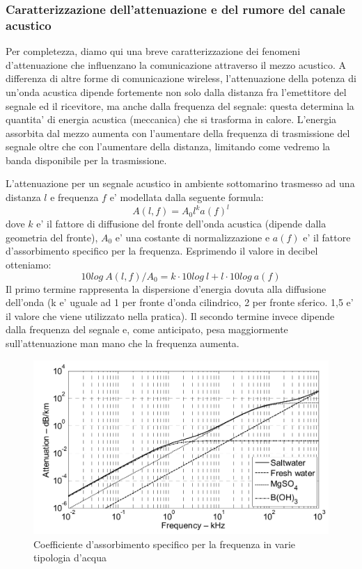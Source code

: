 \subsubsection{Caratterizzazione dell'attenuazione e del rumore del canale acustico}
\par
Per completezza, diamo qui una breve caratterizzazione dei fenomeni d'attenuazione che influenzano la comunicazione attraverso il mezzo acustico. A differenza di altre forme di comunicazione wireless, l'attenuazione della potenza di un'onda acustica dipende fortemente non solo dalla distanza fra l'emettitore del segnale ed il ricevitore, ma anche dalla frequenza del segnale: questa determina la quantita' di energia acustica (meccanica) che si trasforma in calore. L'energia assorbita dal mezzo aumenta con l'aumentare della frequenza di trasmissione del segnale oltre che con l'aumentare della distanza, limitando come vedremo la banda disponibile per la trasmissione.

L'attenuazione per un segnale acustico in ambiente sottomarino trasmesso ad una distanza $l$ e frequenza $f$ e' modellata dalla seguente formula:
\[A(l, f) = A_0 l^k a(f)^l\]
dove $k$ e' il fattore di diffusione del fronte dell'onda acustica (dipende dalla geometria del fronte), $A_0$ e' una costante di normalizzazione e $a(f)$ e' il fattore d'assorbimento specifico per la frequenza.
Esprimendo il valore in decibel otteniamo:
\[10log\ A(l, f)/A_0 = k \cdot 10log\ l + l \cdot 10log\ a(f)\]
Il primo termine rappresenta la dispersione d'energia dovuta alla diffusione dell'onda (k e' uguale ad 1 per fronte d'onda cilindrico, 2 per fronte sferico. 1,5 e' il valore che viene utilizzato nella pratica). Il secondo termine invece dipende dalla frequenza del segnale e, come anticipato, pesa maggiormente sull'attenuazione man mano che la frequenza aumenta.

\begin{figure}[H]
    \centering
    \includegraphics[scale=1.4]{waterabsorption.jpeg}
    \caption{Coefficiente d'assorbimento specifico per la frequenza in varie tipologia d'acqua}
\end{figure}

